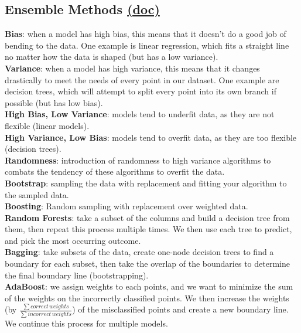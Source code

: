 \documentclass[11pt, a4paper]{article}
\begin{document}
\begin{spacing}{1.1}
	\subsection{Ensemble Methods \href{https://scikit-learn.org/stable/modules/ensemble.html}{(doc)}}
	\textbf{Bias}: when a model has high bias, this means that it doesn't do a good job of bending to the data. One example is linear regression, which fits a straight line no matter how the data is shaped (but has a low variance).\vspace*{2mm}\\
	\textbf{Variance}: when a model has high variance, this means that it changes drastically to meet the needs of every point in our dataset. One example are decision trees, which will attempt to split every point into its own branch if possible (but has low bias).\vspace*{2mm}\\
	\textbf{High Bias, Low Variance}: models tend to underfit data, as they are not flexible (linear models).\vspace*{2mm}\\
	\textbf{High Variance, Low Bias}: models tend to overfit data, as they are too flexible (decision trees). \vspace*{2mm}\\
	\textbf{Randomness}: introduction of randomness to high variance algorithms to combats the tendency of these algorithms to overfit the data. \vspace*{2mm}\\
	\textbf{Bootstrap}:  sampling the data with replacement and fitting your algorithm to the sampled data. \vspace*{2mm}\\
	\textbf{Boosting}: Random sampling with replacement over weighted data. \vspace*{2mm}\\
	\textbf{Random Forests}: take a subset of the columns and build a decision tree from them, then repeat this process multiple times. We then use each tree to predict, and pick the most occurring outcome.\vspace*{2mm}\\
	\textbf{Bagging}: take subsets of the data, create one-node decision trees to find a boundary for each subset, then take the overlap of the boundaries to determine the final boundary line (bootstrapping). \vspace*{2mm}\\
	\textbf{AdaBoost}: we assign weights to each points, and we want to minimize the sum of the weights on the incorrectly classified points. We then increase the weights (by $\frac{\sum correct\, weights}{\sum incorrect\, weights}$) of the misclassified points and create a new boundary line. We continue this process for multiple models. \vspace*{.7mm}\\

\end{spacing}
\end{document}

